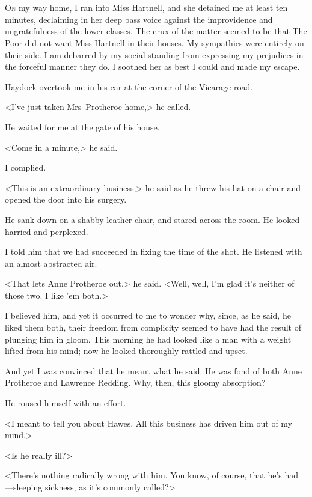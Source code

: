 \chapter[Chapter  \thechapter]{}


\lettrine{O}{n} my way home, I ran into Miss Hartnell, and she detained me at least ten minutes, declaiming in her deep bass voice against the improvidence and ungratefulness of the lower classes. The crux of the matter seemed to be that The Poor did not want Miss Hartnell in their houses. My sympathies were entirely on their side. I am debarred by my social standing from expressing my prejudices in the forceful manner they do. I soothed her as best I could and made my escape.

Haydock overtook me in his car at the corner of the Vicarage road.

<I've just taken Mrs~Protheroe home,> he called.

He waited for me at the gate of his house.

<Come in a minute,> he said.

I complied.

<This is an extraordinary business,> he said as he threw his hat on a chair and opened the door into his surgery.

He sank down on a shabby leather chair, and stared across the room. He looked harried and perplexed.

I told him that we had succeeded in fixing the time of the shot. He listened with an almost abstracted air.

<That lets Anne Protheroe out,> he said. <Well, well, I'm glad it's neither of those two. I like 'em both.>

I believed him, and yet it occurred to me to wonder why, since, as he said, he liked them both, their freedom from complicity seemed to have had the result of plunging him in gloom. This morning he had looked like a man with a weight lifted from his mind; now he looked thoroughly rattled and upset.

And yet I was convinced that he meant what he said. He was fond of both Anne Protheroe and Lawrence Redding. Why, then, this gloomy absorption?

He roused himself with an effort.

<I meant to tell you about Hawes. All this business has driven him out of my mind.>

<Is he really ill?>

<There's nothing radically wrong with him. You know, of course, that he's had —sleeping sickness, as it's commonly called?>

